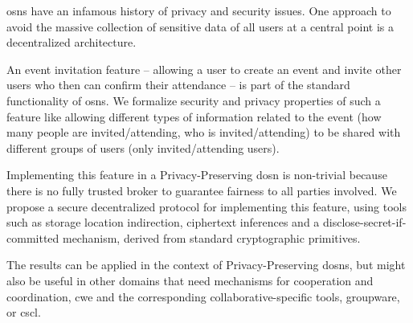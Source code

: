 
%

\Acp*{osn} have an infamous history of privacy and security issues. One approach 
to avoid the massive collection of sensitive data of all users at a central point 
is a decentralized architecture.

An event invitation feature -- allowing a user to create an event
and invite other users who then can confirm their attendance --
is part of the standard functionality of \acsp*{osn}. 
%
We formalize security and privacy properties of such a feature 
like allowing different types
of information related to the event (\eg how many people are
invited/attending, who is invited/attending) to be shared with 
different groups of users (\eg only invited/attending users).

Implementing this 
feature in a Privacy-Preserving \Acl*{dosn} is non-trivial because there is 
no fully trusted broker to guarantee fairness to all parties involved. 
%
We propose a secure decentralized protocol for implementing
this feature, 
using tools such as storage location indirection, ciphertext inferences
and a disclose-secret-if-committed mechanism, derived from standard
cryptographic primitives.

The results can be applied in the context of Privacy-Preserving \acsp*{dosn}, but 
might also be useful in other domains that need mechanisms for cooperation and coordination, 
\eg \Acl*{cwe} and the corresponding collaborative-specific tools, \ie groupware, 
or \Acl*{cscl}.
